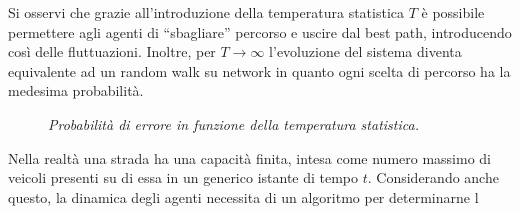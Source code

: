 \documentclass[../main.tex]{subfiles}
\begin{document}
Si osservi che grazie all'introduzione della temperatura statistica $T$ \`e possibile permettere agli agenti di ``sbagliare'' percorso e uscire dal best path, introducendo cos\`i delle fluttuazioni.
Inoltre, per $T \to \infty$ l'evoluzione del sistema diventa equivalente ad un random walk su network in quanto ogni scelta di percorso ha la medesima probabilit\`a.
\begin{figure}[H]
    \centering
    \caption[Temperatura statistica]{\emph{Probabilit\`a di errore in funzione della temperatura statistica.}}
    \label{fig:temperature}
\end{figure}
Nella realt\`a una strada ha una capacit\`a finita, intesa come numero massimo di veicoli presenti su di essa in un generico istante di tempo $t$.
Considerando anche questo, la dinamica degli agenti necessita di un algoritmo per determinarne l
\end{document}
